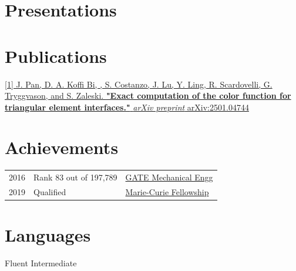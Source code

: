 \documentclass[]{deedy-resume-openfont}
\begin{document}
\begin{minipage}[t]{0.49\textwidth}
\section{Presentations}



\section{Publications}
\href{https://doi.org/10.48550/arXiv.2501.04744}
{[1] J. Pan, D. A. Koffi Bi, , S. Costanzo, J. Lu, Y. Ling, R. Scardovelli, G. Tryggvason, and S. Zaleski.
\textbf{"Exact computation of the color function for triangular element interfaces."} \textit{arXiv preprint} arXiv:2501.04744}


\section{Achievements}
\setlength{\tabcolsep}{3pt}
\begin{tabular}{lll}
2016	     & Rank 83 out of 197,789  & \href{https://gate.iisc.ac.in/}{GATE Mechanical Engg}\\
2019	     & Qualified       & \href{https://marie-sklodowska-curie-actions.ec.europa.eu/actions/doctoral-networks}{Marie-Curie Fellowship}\\
\end{tabular}


\section{Languages}
 Fluent \textbullet{}  Intermediate



\end{minipage}
\end{document}
